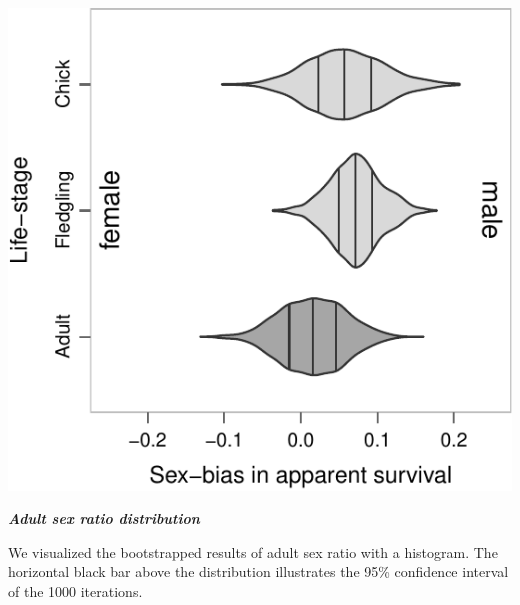 \documentclass[]{article}
\begin{document}
\begin{center}\includegraphics{Ceuta_ASR_Matrix_Modeling_files/figure-latex/unnamed-chunk-29-1} \end{center}

\textbf{\emph{Adult sex ratio distribution}}

We visualized the bootstrapped results of adult sex ratio with a
histogram. The horizontal black bar above the distribution illustrates
the 95\% confidence interval of the 1000 iterations.
\end{document}
